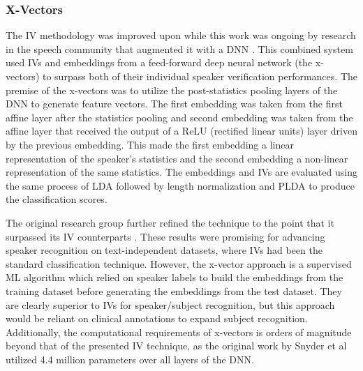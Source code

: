 \subsubsection{X-Vectors}

The \ac{IV} methodology was improved upon while this work was ongoing by research in the speech community that augmented it with a \ac{DNN} \cite{Snyder2017}. This combined system used \acp{IV} and embeddings from a feed-forward deep neural network (the x-vectors) to surpass both of their individual speaker verification performances. The premise of the x-vectors was to utilize the post-statistics pooling layers of the \ac{DNN} to generate feature vectors. The first embedding was taken from the first affine layer after the statistics pooling and second embedding was taken from the affine layer that received the output of a ReLU (rectified linear units) layer driven by the previous embedding. This made the first embedding a linear representation of the speaker's statistics and the second embedding a non-linear representation of the same statistics. The embeddings and \acp{IV} are evaluated using the same process of \ac{LDA} followed by length normalization and \ac{PLDA} to produce the classification scores.

The original research group further refined the technique to the point that it surpassed its \ac{IV} counterparts \cite{Snyder2018}. These results were promising for advancing speaker recognition on text-independent datasets, where \acp{IV} had been the standard classification technique. However, the x-vector approach is a supervised \ac{ML} algorithm which relied on speaker labels to build the embeddings from the training dataset before generating the embeddings from the test dataset. They are clearly superior to \acp{IV} for speaker/subject recognition, but this approach would be reliant on clinical annotations to expand subject recognition. Additionally, the computational requirements of x-vectors is orders of magnitude beyond that of the presented \ac{IV} technique, as the original work by Snyder et al \cite{Snyder2017} utilized 4.4 million parameters over all layers of the \ac{DNN}.